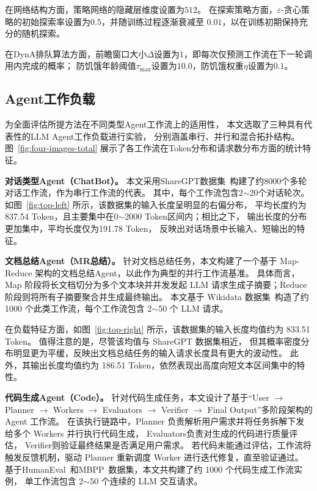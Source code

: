 在网络结构方面，策略网络的隐藏层维度设置为$512$。
在探索策略方面，$\varepsilon$-贪心策略的初始探索率设置为$0.5$，并随训练过程逐渐衰减至
$0.01$，以在训练初期保持充分的随机探索。

在DynA排队算法方面，前瞻窗口大小$\Delta$设置为$1$，即每次仅预测工作流在下一轮调用内完成的概率；
防饥饿年龄阈值$\tau_{\max}$设置为$10.0$，防饥饿权重$\eta$设置为$0.1$。

\subsection{Agent工作负载}

为全面评估所提方法在不同类型Agent工作流上的适用性，
本文选取了三种具有代表性的LLM Agent工作负载进行实验，
分别涵盖串行、并行和混合拓扑结构。
图~\ref{fig:four-images-total} 展示了各工作流在Token分布和请求数分布方面的统计特征。

\textbf{对话类型Agent（ChatBot）。}
本文采用ShareGPT数据集~\cite{chiang2023vicuna}构建了约8000个多轮对话工作流，作为串行工作流的代表。
其中，每个工作流包含2$\sim$20个对话轮次。
如图~\ref{fig:top-left} 所示，该数据集的输入长度呈明显的右偏分布，
平均长度约为837.54 Token，且主要集中在0$\sim$2000 Token区间内；相比之下，
输出长度的分布更加集中，平均长度仅为191.78 Token，
反映出对话场景中长输入、短输出的特征。

\textbf{文档总结Agent（MR总结）。}
针对文档总结任务，本文构建了一个基于 Map-Reduce 架构的文档总结Agent，以此作为典型的并行工作流基准。
具体而言，Map 阶段将长文档切分为多个文本块并并发发起 LLM 请求生成子摘要；Reduce 阶段则将所有子摘要聚合并生成最终输出。
本文基于 Wikidata 数据集~\cite{vrandevcic2014wikidata}构造了约 1000 个此类工作流，每个工作流包含 2$\sim$50 个 LLM 请求。

在负载特征方面，如图~\ref{fig:top-right} 所示，该数据集的输入长度均值约为 833.51 Token。
值得注意的是，尽管该均值与 ShareGPT 数据集相近，
但其概率密度分布明显更为平缓，反映出文档总结任务的输入请求长度具有更大的波动性。
此外，其输出长度均值约为 186.51 Token，依然表现出高度向短文本区间集中的特性。

\textbf{代码生成Agent（Code）。}
针对代码生成任务，本文设计了基于“User $\rightarrow$ Planner $\rightarrow$ Workers $\rightarrow$ Evaluators
 $\rightarrow$ Verifier $\rightarrow$ Final Output”多阶段架构的 Agent 工作流。
在该执行链路中，Planner 负责解析用户需求并将任务拆解下发给多个 Workers 并行执行代码生成，
Evaluators负责对生成的代码进行质量评估，
Verifier则验证最终结果是否满足用户需求。
若代码未能通过评估，工作流将触发反馈机制，驱动 Planner 重新调度 Worker 进行迭代修复，直至验证通过。
基于HumanEval~\cite{chen2021evaluating}和MBPP~\cite{austin2021program}数据集，本文共构建了约 1000 个代码生成工作流实例，
单工作流包含 2$\sim$50 个连续的 LLM 交互请求。

